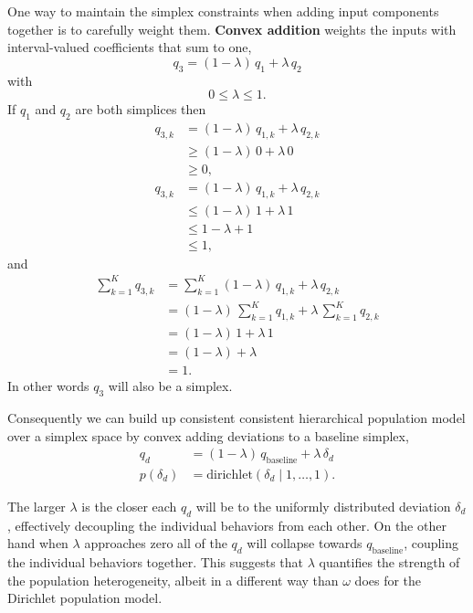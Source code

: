 \documentclass[
  letterpaper,
  DIV=11,
  numbers=noendperiod]{scrartcl}
\begin{document}
One way to maintain the simplex constraints when adding input components
together is to carefully weight them. \textbf{Convex addition} weights
the inputs with interval-valued coefficients that sum to one, \[
q_{3} = (1 - \lambda) \, q_{1} + \lambda \, q_{2}
\] with \[
0 \le \lambda \le 1.
\] If \(q_{1}\) and \(q_{2}\) are both simplices then \begin{align*}
q_{3, k}
&=
(1 - \lambda) \, q_{1, k} + \lambda \, q_{2, k}
\\
&\ge
(1 - \lambda) \, 0 + \lambda \, 0
\\
&\ge
0,
\end{align*} \begin{align*}
q_{3 ,k}
&=
(1 - \lambda) \, q_{1, k} + \lambda \, q_{2, k}
\\
&\le
(1 - \lambda) \, 1 + \lambda \, 1
\\
&\le
1 - \lambda + 1
\\
&\le
1,
\end{align*} and \begin{align*}
\sum_{k = 1}^{K} q_{3, k}
&=
  \sum_{k = 1}^{K} (1 - \lambda) \, q_{1, k} + \lambda \, q_{2, k}
\\
&=
    (1 - \lambda) \, \sum_{k = 1}^{K} q_{1, k}
  + \lambda \, \sum_{k = 1}^{K} q_{2, k}
\\
&=
(1 - \lambda) \, 1 + \lambda \, 1
\\
&=
(1 - \lambda) + \lambda
\\
&=
1.
\end{align*} In other words \(q_{3}\) will also be a simplex.

Consequently we can build up consistent consistent hierarchical
population model over a simplex space by convex adding deviations to a
baseline simplex, \begin{align*}
q_{d}
&=
(1 - \lambda) \, q_{\mathrm{baseline}} + \lambda \, \delta_{d}
\\
p( \delta_{d} )
&=
\mathrm{dirichlet}( \delta_{d} \mid 1, \ldots, 1 ).
\end{align*}

The larger \(\lambda\) is the closer each \(q_{d}\) will be to the
uniformly distributed deviation \(\delta_{d}\), effectively decoupling
the individual behaviors from each other. On the other hand when
\(\lambda\) approaches zero all of the \(q_{d}\) will collapse towards
\(q_{\mathrm{baseline}}\), coupling the individual behaviors together.
This suggests that \(\lambda\) quantifies the strength of the population
heterogeneity, albeit in a different way than \(\omega\) does for the
Dirichlet population model.
\end{document}

